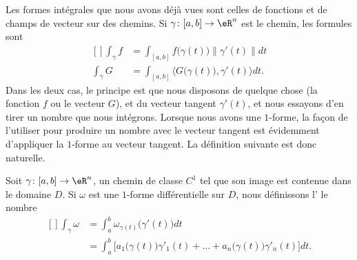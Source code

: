 Les formes intégrales que nous avons déjà vues sont celles de fonctions et de champs de vecteur sur des chemins. Si \( \gamma\colon [a,b]\to \eR^n\) est le chemin, les formules sont
\begin{equation}
	\begin{aligned}[]
		\int_{\gamma}f & =\int_{[a,b]}f\big( \gamma(t) \big)\| \gamma'(t) \|dt              \\
		\int_{\gamma}G & =\int_{[a,b]}\langle G\big( \gamma(t) \big), \gamma'(t)\rangle dt.
	\end{aligned}
\end{equation}
Dans les deux cas, le principe est que nous disposons de quelque chose (la fonction \( f\) ou le vecteur \( G\)), et du vecteur tangent \( \gamma'(t)\), et nous essayons d'en tirer un nombre que nous intégrons. Lorsque nous avons une \( 1\)-forme, la façon de l'utiliser pour produire un nombre avec le vecteur tangent est évidemment d'appliquer la \( 1\)-forme au vecteur tangent. La définition suivante est donc naturelle.

\begin{definition}
	Soit \( \gamma\colon [a,b]\to \eR^n\), un chemin de classe \( C^1\) tel que son image est contenue dans le domaine \( D\). Si \( \omega\) est une \( 1\)-forme différentielle sur \( D\), nous définissons l' le nombre
	\begin{equation}
		\begin{aligned}[]
			\int_{\gamma}\omega & =\int_a^b\omega_{\gamma(t)}\big( \gamma'(t) \big)dt                                                         \\
			                    & =\int_a^b\Big[ a_1\big( \gamma(t) \big)\gamma'_1(t)+\ldots +  a_n\big( \gamma(t) \big)\gamma'_n(t) \Big]dt.
		\end{aligned}
	\end{equation}
\end{definition}

